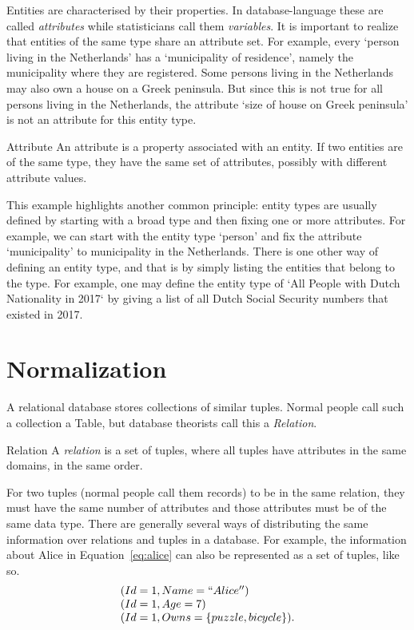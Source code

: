 Entities are characterised by their properties. In database-language these are
called \emph{attributes} while statisticians call them \emph{variables}.  It is
important to realize that entities of the same type share an attribute set. For
example, every `person living in the Netherlands' has a `municipality of
residence', namely the municipality where they are registered. Some persons
living in the Netherlands may also own a house on a Greek peninsula. But since
this is not true for all persons living in the Netherlands, the attribute `size
of house on Greek peninsula' is not an attribute for this entity type.
\begin{terminology}{Attribute}
An attribute is a property associated with an entity.  If two entities are of
the same type, they have the same set of attributes, possibly with different
attribute values.
\end{terminology}

This example highlights another common principle: entity types are usually
defined by starting with a broad type and then fixing one or more attributes.
For example, we can start with the entity type `person' and fix the attribute
`municipality' to municipality in the Netherlands. There is one other way of
defining an entity type, and that is by simply listing the entities that belong
to the type. For example, one may define the entity type of `All People with
Dutch Nationality in 2017` by giving a list of all Dutch Social Security
numbers that existed in 2017.


\section{Normalization}
A relational database stores collections of similar tuples.  Normal people call
such a collection a Table, but database theorists call this a \emph{Relation}.
\begin{terminology}{Relation}
A \emph{relation} is a set of tuples, where all tuples have attributes in the
same domains, in the same order.
\end{terminology}
For two tuples (normal people call them records) to be in the same relation,
they must have the same number of attributes and those attributes must be of
the same data type. There are generally several ways of distributing the same
information over relations and tuples in a database. For example, the
information about Alice in Equation~\eqref{eq:alice} can also be represented as a set of
tuples, like so.
\begin{equation}
\begin{array}{l}
(Id=1, Name=``Alice'')\\
(Id=1, Age=7)\\
(Id=1, Owns = \{puzzle, bicycle\}).
\end{array}
\end{equation}

